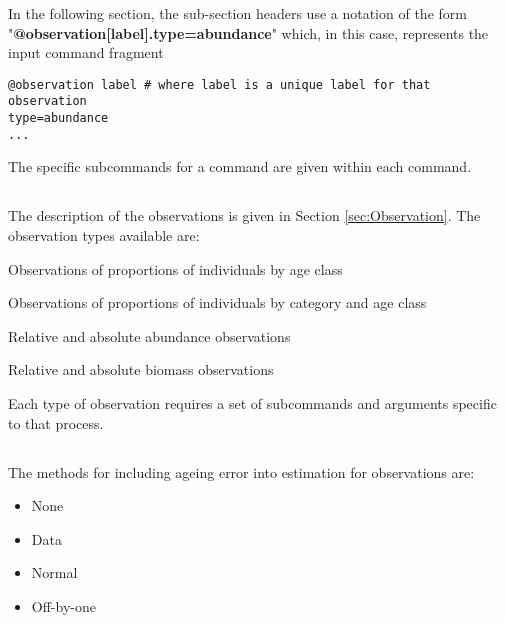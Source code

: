 In the following section, the sub-section headers use a notation of the form "\textbf {@observation[label].type=abundance}" which, in this case, represents the input command fragment
{\small{\begin{verbatim}
@observation label # where label is a unique label for that observation
type=abundance
...
\end{verbatim}}}
The specific subcommands for a command are given within each command.

\subsection{}\label{syntax:ObservationTypes}

The description of the observations is given in Section \ref{sec:Observation}. The observation types available are:

\begin{description}
  \item Observations of proportions of individuals by age class
  \item Observations of proportions of individuals by category and age class
  \item Relative and absolute abundance observations
  \item Relative and absolute biomass observations
\end{description}

Each type of observation requires a set of subcommands and arguments specific to that process.
\ifAgeBased

\else

\fi %



\subsection{}


\ifAgeBased
\subsection{}\label{syntax:AgeingError}

The methods for including ageing error into estimation for observations are:

\begin{itemize}
	\item None
	\item Data
	\item Normal
	\item Off-by-one
\end{itemize}

